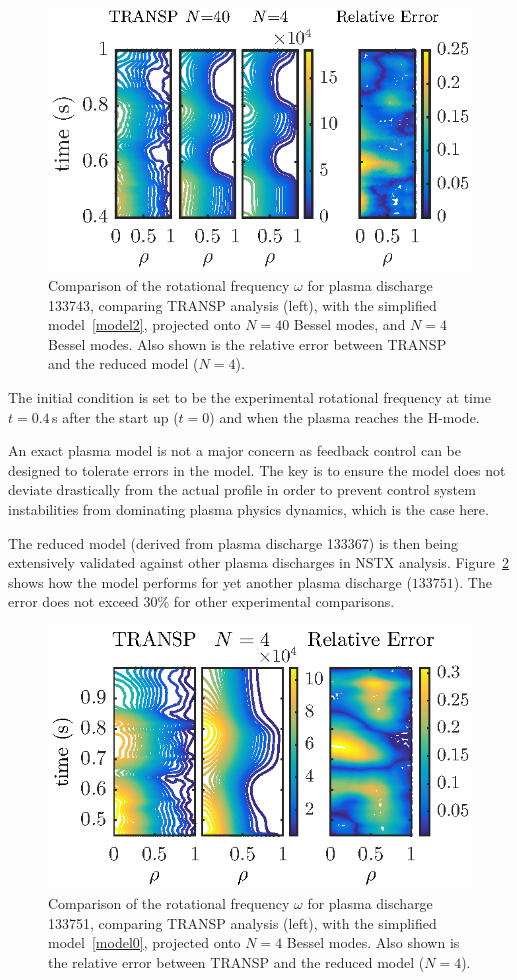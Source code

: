 \documentclass[12pt,lot, lof]{puthesis}
\begin{document}
\begin{figure}[htbp]
\includegraphics[width=0.9 \linewidth]{fig9}
\caption{Comparison of the rotational frequency $\omega$ for plasma discharge 133743, comparing TRANSP analysis (left), with the simplified model~\eqref{model2}, projected onto $N=40$ Bessel modes, and $N=4$ Bessel modes.  Also shown is the relative error between TRANSP and the reduced model ($N=4$).}
\label{heho_fig10}
\end{figure}


The initial condition is set to be the experimental rotational frequency at  time $t=0.4$\,s after the start up ($t=0$) and when the plasma reaches the H-mode.

An exact plasma model is not a major concern as feedback control can be designed to tolerate errors in the model. The key is to ensure the model does not deviate drastically from the actual profile in order to prevent control system instabilities from dominating plasma physics dynamics, which is the case here.

The reduced model (derived from plasma discharge 133367) is then being extensively validated against other plasma discharges in NSTX analysis.
Figure~\ref{heho1} shows how the model performs for yet another plasma discharge ($133751$). The error does not exceed 30\% for other experimental comparisons.

\begin{figure}[htbp]
\centering
\includegraphics [width=0.8 \linewidth]{fig10}
\caption{Comparison of the rotational frequency $\omega$ for plasma discharge 133751, comparing TRANSP analysis (left), with the simplified model~\eqref{model0}, projected onto $N=4$ Bessel modes.  Also shown is the relative error between TRANSP and the reduced model ($N=4$).}
\label{heho1}
\end{figure}
\end{document}
